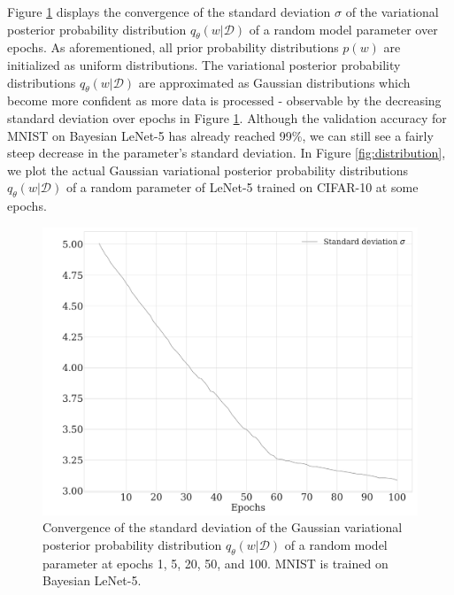\pagebreak
\newline Figure \ref{fig:std_CNN} displays the convergence of the standard deviation $\sigma$ of the variational posterior probability distribution $q_{\theta}(w|\mathcal{D})$ of a random model parameter over epochs. As aforementioned, all prior probability distributions $p(w)$ are initialized as uniform distributions. The variational posterior probability distributions $q_{\theta}(w|\mathcal{D})$ are approximated as Gaussian distributions which become more confident as more data is processed - observable by the decreasing standard deviation over epochs in Figure \ref{fig:std_CNN}. Although the validation accuracy for MNIST on Bayesian LeNet-5 has already reached 99\%, we can still see a fairly steep decrease in the parameter's standard deviation. In Figure \ref{fig:distribution}, we plot the actual Gaussian variational posterior probability distributions $q_{\theta}(w|\mathcal{D})$ of a random parameter of LeNet-5 trained on CIFAR-10 at some epochs.
%
\begin{figure}[H] 
\begin{center}
\includegraphics[width=\linewidth]{Chapter5/Figs/std_CNN.png}
\caption{Convergence of the standard deviation of the Gaussian variational posterior probability distribution $q_{\theta}(w|\mathcal{D})$ of a random model parameter at epochs 1, 5, 20, 50, and 100. MNIST is trained on Bayesian LeNet-5.}
\label{fig:std_CNN}
\end{center}
\end{figure} 
%

